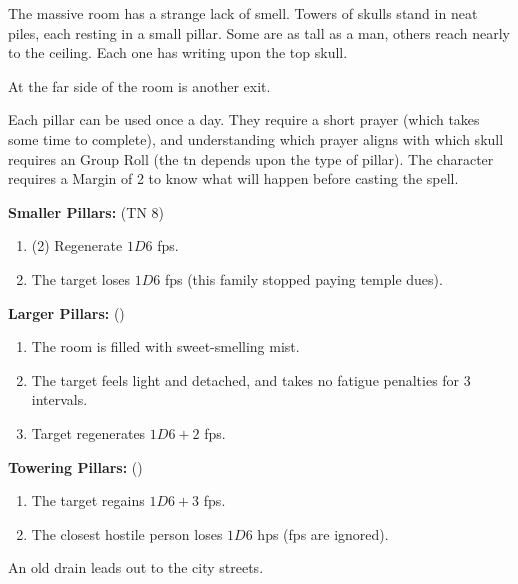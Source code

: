 \begin{boxtext}

  The massive room has a strange lack of smell.  Towers of skulls stand in neat piles, each resting in a small pillar.  Some are as tall as a man, others reach nearly to the ceiling.  Each one has writing upon the top skull.

  At the far side of the room is another exit.

\end{boxtext}

Each pillar can be used once a day.
They require a short prayer (which takes some time to complete), and understanding which prayer aligns with which skull requires an  Group Roll (the \gls{tn} depends upon the type of pillar).
The character requires a Margin of 2 to know what will happen before casting the spell.%

\textbf{Smaller Pillars:} (TN 8)

\begin{enumerate}
  \item{(2) Regenerate $1D6$ \glspl{fp}.}
  \item{The target loses $1D6$ \glspl{fp} (this family stopped paying temple dues).}
\end{enumerate}

\textbf{Larger Pillars:} (\tn[10])

\begin{enumerate}
  \item
  The room is filled with sweet-smelling mist.
  \item
  The target feels light and detached, and takes no \gls{fatigue} penalties for 3 \glspl{interval}.
  \item
  Target regenerates $1D6+2$ \glspl{fp}.
\end{enumerate}

\textbf{Towering Pillars:} (\tn[12])

\begin{enumerate}
  \item
  The target regains $1D6+3$ \glspl{fp}.
  \item
  The closest hostile person loses $1D6$ \glspl{hp} (\glspl{fp} are ignored).
\end{enumerate}

\label{slum_exit}

An old drain leads out to the city streets.


